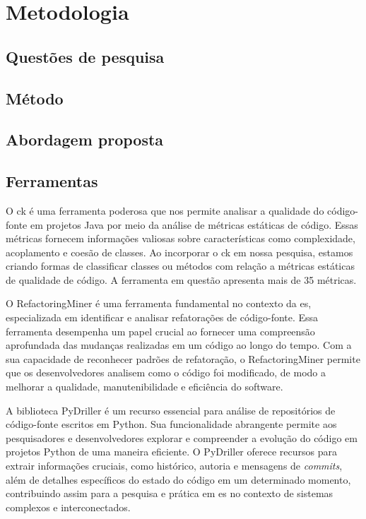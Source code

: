 
\chapter{Metodologia}\label{cap:Metodologia}

\section{Questões de pesquisa}

\section{Método}

\section{Abordagem proposta}

\section{Ferramentas}\label{sec:ferramentas}
O \gls{ck} \cite{aniche-ck} é uma ferramenta poderosa que nos permite analisar a qualidade do código-fonte em projetos Java por meio da análise de métricas estáticas de código. Essas métricas fornecem informações valiosas sobre características como complexidade, acoplamento e coesão de classes. Ao incorporar o \gls{ck} em nossa pesquisa, estamos criando formas de classificar classes ou métodos com relação a métricas estáticas de qualidade de código. A ferramenta em questão apresenta mais de 35 métricas.

O RefactoringMiner \cite{Tsantalis:ICSE:2018:RefactoringMiner} é uma ferramenta fundamental no contexto da \gls{es}, especializada em identificar e analisar refatorações de código-fonte. Essa ferramenta desempenha um papel crucial ao fornecer uma compreensão aprofundada das mudanças realizadas em um código ao longo do tempo. Com a sua capacidade de reconhecer padrões de refatoração, o RefactoringMiner permite que os desenvolvedores analisem como o código foi modificado, de modo a melhorar a qualidade, manutenibilidade e eficiência do software.

A biblioteca PyDriller \cite{PyDrillerSpadini2018} é um recurso essencial para análise de repositórios de código-fonte escritos em Python. Sua funcionalidade abrangente permite aos pesquisadores e desenvolvedores explorar e compreender a evolução do código em projetos Python de uma maneira eficiente. O PyDriller oferece recursos para extrair informações cruciais, como histórico, autoria e mensagens de \textit{commits}, além de detalhes específicos do estado do código em um determinado momento, contribuindo assim para a pesquisa e prática em \gls{es} no contexto de sistemas complexos e interconectados.

